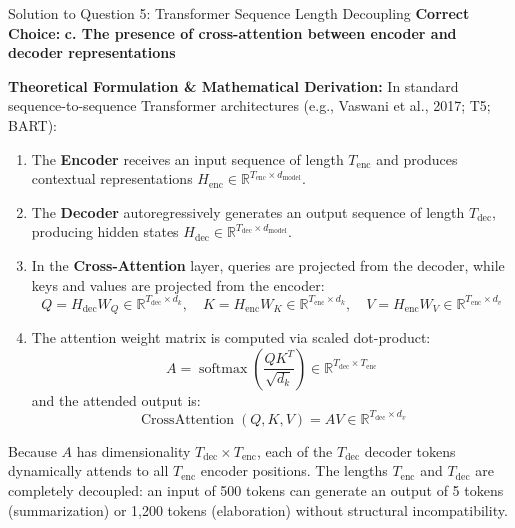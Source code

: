 \documentclass[11pt,a4paper]{article}
\begin{document}
\vspace{1.5em}

\begin{solutionbox}{Solution to Question 5: Transformer Sequence Length Decoupling}
\textbf{Correct Choice:} \textbf{c. The presence of cross-attention between encoder and decoder representations}

\medskip
\noindent
\textbf{Theoretical Formulation \& Mathematical Derivation:}
In standard sequence-to-sequence Transformer architectures (e.g., Vaswani et al., 2017; T5; BART):
\begin{enumerate}[leftmargin=1.5em]
    \item The \textbf{Encoder} receives an input sequence of length $T_{\text{enc}}$ and produces contextual representations $H_{\text{enc}} \in \mathbb{R}^{T_{\text{enc}} \times d_{\text{model}}}$.
    \item The \textbf{Decoder} autoregressively generates an output sequence of length $T_{\text{dec}}$, producing hidden states $H_{\text{dec}} \in \mathbb{R}^{T_{\text{dec}} \times d_{\text{model}}}$.
    \item In the \textbf{Cross-Attention} layer, queries are projected from the decoder, while keys and values are projected from the encoder:
    \begin{equation*}
        Q = H_{\text{dec}} W_Q \in \mathbb{R}^{T_{\text{dec}} \times d_k}, \quad K = H_{\text{enc}} W_K \in \mathbb{R}^{T_{\text{enc}} \times d_k}, \quad V = H_{\text{enc}} W_V \in \mathbb{R}^{T_{\text{enc}} \times d_v}
    \end{equation*}
    \item The attention weight matrix is computed via scaled dot-product:
    \begin{equation*}
        A = \operatorname{softmax}\left( \frac{Q K^T}{\sqrt{d_k}} \right) \in \mathbb{R}^{T_{\text{dec}} \times T_{\text{enc}}}
    \end{equation*}
    and the attended output is:
    \begin{equation*}
        \operatorname{CrossAttention}(Q, K, V) = A V \in \mathbb{R}^{T_{\text{dec}} \times d_v}
    \end{equation*}
\end{enumerate}
Because $A$ has dimensionality $T_{\text{dec}} \times T_{\text{enc}}$, each of the $T_{\text{dec}}$ decoder tokens dynamically attends to all $T_{\text{enc}}$ encoder positions. The lengths $T_{\text{enc}}$ and $T_{\text{dec}}$ are completely decoupled: an input of 500 tokens can generate an output of 5 tokens (summarization) or 1,200 tokens (elaboration) without structural incompatibility.


\end{solutionbox}
\end{document}
